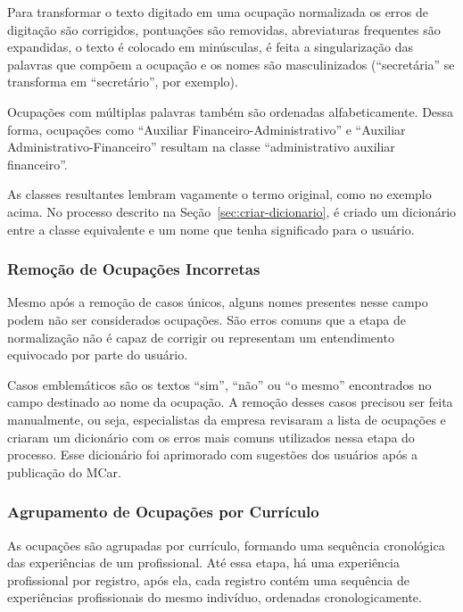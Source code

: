 \documentclass[12pt,a4paper]{article}
\begin{document}
Para transformar o texto digitado em uma ocupação normalizada os erros de digitação são corrigidos, pontuações são removidas, abreviaturas frequentes são expandidas, o texto é colocado em minúsculas, é feita a singularização das palavras que compõem a ocupação e os nomes são masculinizados (\enquote{secretária} se transforma em \enquote{secretário}, por exemplo).

Ocupações com múltiplas palavras também são ordenadas alfabeticamente. Dessa forma, ocupações como \enquote{Auxiliar Financeiro-Administrativo} e \enquote{Auxiliar Administrativo-Financeiro} resultam na classe \enquote{administrativo auxiliar financeiro}.

As classes resultantes lembram vagamente o termo original, como no exemplo acima. No processo descrito na Seção~\ref{sec:criar-dicionario}, é criado um dicionário entre a classe equivalente e um nome que tenha significado para o usuário.

\subsubsection{Remoção de Ocupações Incorretas} \label{sec:remocao-ocupacoes-incorretas}

Mesmo após a remoção de casos únicos, alguns nomes presentes nesse campo podem não ser considerados ocupações. São erros comuns que a etapa de normalização não é capaz de corrigir ou representam um entendimento equivocado por parte do usuário.

Casos emblemáticos são os textos \enquote{sim}, \enquote{não} ou \enquote{o mesmo} encontrados no campo destinado ao nome da ocupação. A remoção desses casos precisou ser feita manualmente, ou seja, especialistas da empresa revisaram a lista de ocupações e criaram um dicionário com os erros mais comuns utilizados nessa etapa do processo. Esse dicionário foi aprimorado com sugestões dos usuários após a publicação do MCar.

\subsubsection{Agrupamento de Ocupações por Currículo}

As ocupações são agrupadas por currículo, formando uma sequência cronológica das experiências de um profissional. Até essa etapa, há uma experiência profissional por registro, após ela, cada registro contém uma sequência de experiências profissionais do mesmo indivíduo, ordenadas cronologicamente.
\end{document}
